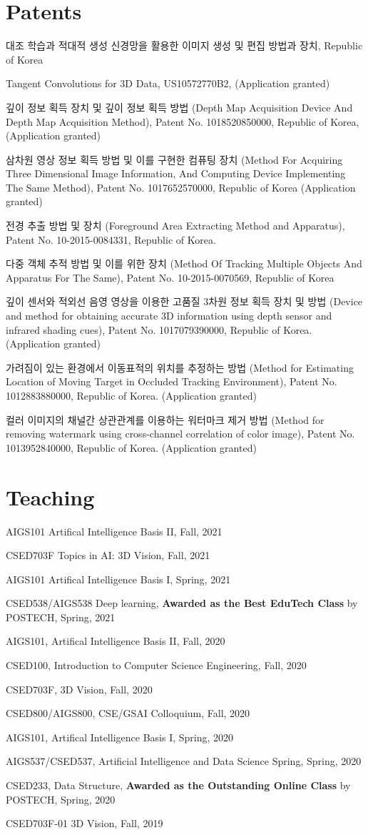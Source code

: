 \documentclass[letterpaper,11pt]{article}
\newcommand{\resumeItem}[1]{
  \small{
  \item{#1 \vspace{-2pt}}
  }
}
\newcommand{\resumeItemListStart}{\begin{itemize}}
\newcommand{\resumeItemListEnd}{\end{itemize}\vspace{-5pt}}
\begin{document}
\section{Patents}
\resumeItemListStart
    \resumeItem{대조 학습과 적대적 생성 신경망을 활용한 이미지 생성 및 편집 방법과 장치, Republic of Korea}
    \resumeItem{Tangent Convolutions for 3D Data, US10572770B2, (Application granted)}
    \resumeItem{깊이 정보 획득 장치 및 깊이 정보 획득 방법 (Depth Map Acquisition Device And Depth Map Acquisition Method), Patent No. 1018520850000, Republic of Korea, (Application granted)}
    \resumeItem{삼차원 영상 정보 획득 방법 및 이를 구현한 컴퓨팅 장치 (Method For Acquiring Three Dimensional Image Information, And Computing Device Implementing The Same Method), Patent No. 1017652570000, Republic of Korea (Application granted)}
    \resumeItem{전경 추출 방법 및 장치 (Foreground Area Extracting Method and Apparatus), Patent No. 10-2015-0084331, Republic of Korea.}
    \resumeItem{다중 객체 추적 방법 및 이를 위한 장치 (Method Of Tracking Multiple Objects And Apparatus For The Same), Patent No. 10-2015-0070569, Republic of Korea}
    \resumeItem{깊이 센서와 적외선 음영 영상을 이용한 고품질 3차원 정보 획득 장치 및 방법 (Device and method for obtaining accurate 3D information using depth sensor and infrared shading cues), Patent No. 1017079390000, Republic of Korea. (Application granted)}
    \resumeItem{가려짐이 있는 환경에서 이동표적의 위치를 추정하는 방법 (Method for Estimating Location of Moving Target in Occluded Tracking Environment), Patent No. 1012883880000, Republic of Korea. (Application granted)}
    \resumeItem{컬러 이미지의 채널간 상관관계를 이용하는 워터마크 제거 방법 (Method for removing watermark using cross-channel correlation of color image), Patent No. 1013952840000, Republic of Korea. (Application granted)}
\resumeItemListEnd



\section{Teaching}
\resumeItemListStart
    \resumeItem{AIGS101 Artifical Intelligence Basis II, Fall,  2021}
    \resumeItem{CSED703F Topics in AI: 3D Vision, Fall,  2021}
    \resumeItem{AIGS101 Artifical Intelligence Basis I, Spring,  2021}
    \resumeItem{CSED538/AIGS538 Deep learning, \textbf{Awarded as the Best EduTech Class} by POSTECH, Spring,  2021}
    \resumeItem{AIGS101, Artifical Intelligence Basis II, Fall,  2020}
    \resumeItem{CSED100, Introduction to Computer Science Engineering, Fall,  2020}
    \resumeItem{CSED703F, 3D Vision, Fall,  2020}
    \resumeItem{CSED800/AIGS800, CSE/GSAI Colloquium, Fall,  2020}
    \resumeItem{AIGS101, Artifical Intelligence Basis I, Spring,  2020}
    \resumeItem{AIGS537/CSED537, Artificial Intelligence and Data Science Spring, Spring,  2020}
    \resumeItem{CSED233, Data Structure, \textbf{Awarded as the Outstanding Online Class} by POSTECH, Spring,  2020}
    \resumeItem{CSED703F-01 3D Vision, Fall,  2019}
\resumeItemListEnd
\end{document}
